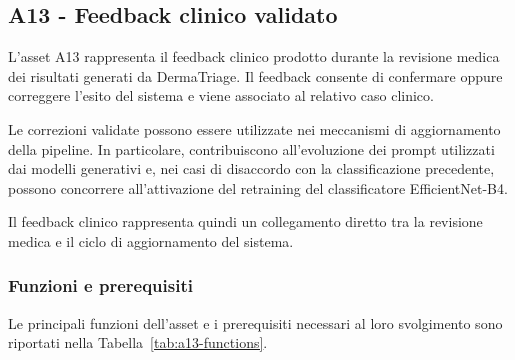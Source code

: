 \subsection{A13 - Feedback clinico validato}
L'asset A13 rappresenta il feedback clinico prodotto durante la revisione medica dei risultati generati da DermaTriage. Il feedback consente di confermare oppure correggere l'esito del sistema e viene associato al relativo caso clinico.

Le correzioni validate possono essere utilizzate nei meccanismi di aggiornamento della pipeline. In particolare, contribuiscono all'evoluzione dei prompt utilizzati dai modelli generativi e, nei casi
di disaccordo con la classificazione precedente, possono concorrere all'attivazione del retraining del classificatore EfficientNet-B4.

Il feedback clinico rappresenta quindi un collegamento diretto tra la revisione medica e il ciclo di aggiornamento del sistema.

\subsubsection{Funzioni e prerequisiti}
Le principali funzioni dell'asset e i prerequisiti necessari al loro svolgimento sono riportati nella Tabella~\ref{tab:a13-functions}.

